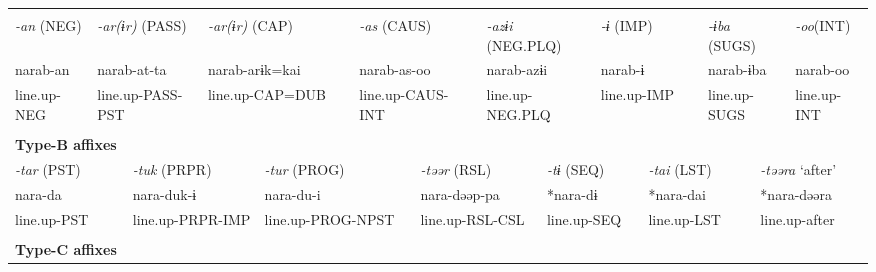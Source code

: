 \tabletail{}
\tablelasttail{}
\begin{tabularx}{\textwidth}{XXXXXXXXXm{}XXXXXXXXXXXX}
\lsptoprule
\multicolumn{22}{X}{{\bfseries Type-A affixes}}\\
{ \textit{{}-an} (NEG)} & \multicolumn{5}{X}{{ \textit{{}-ar(ɨr)} (PASS)}} & \multicolumn{3}{X}{{ \textit{{}-ar(ɨr)} (CAP)}} & \multicolumn{4}{X}{{ \textit{{}-as} (CAUS)}} & \multicolumn{4}{X}{{ \textit{{}-azɨi} (NEG.PLQ)}} & \multicolumn{2}{X}{{ \textit{{}-ɨ} (IMP)}} & \multicolumn{2}{X}{{ \textit{{}-ɨba} (SUGS)}} & { \textit{{}-oo}(INT)}\\
{ narab-an} & \multicolumn{5}{X}{{ narab-at-ta}} & \multicolumn{3}{X}{{ narab-arɨk=kai}} & \multicolumn{4}{X}{{ narab-as-oo}} & \multicolumn{4}{X}{{ narab-azɨi}} & \multicolumn{2}{X}{{ narab-ɨ}} & \multicolumn{2}{X}{{ narab-ɨba}} & { narab-oo}\\
line.up-NEG & \multicolumn{5}{X}{line.up-PASS-PST} & \multicolumn{3}{X}{line.up-CAP=DUB} & \multicolumn{4}{X}{line.up-CAUS-INT} & \multicolumn{4}{X}{line.up-NEG.PLQ} & \multicolumn{2}{X}{line.up-IMP} & \multicolumn{2}{X}{line.up-SUGS} & line.up-INT\\
\multicolumn{22}{X}{}\\
\multicolumn{22}{X}{{\bfseries Type-B affixes}}\\
\multicolumn{3}{X}{{ \textit{{}-tar} (PST)}} & \multicolumn{4}{X}{{ \textit{{}-tuk} (PRPR)}} & \multicolumn{4}{X}{{ \textit{{}-tur} (PROG)}} & \multicolumn{4}{X}{{ \textit{{}-təər} (RSL)}} & \multicolumn{3}{X}{{ \textit{{}-tɨ} (SEQ)}} & \multicolumn{2}{X}{{ \textit{{}-tai} (LST)}} & \multicolumn{2}{X}{{ \textit{{}-təəra} ‘after’}}\\
\multicolumn{3}{X}{{ nara-da}} & \multicolumn{4}{X}{{ nara-duk-ɨ}} & \multicolumn{4}{X}{{ nara-du-i}} & \multicolumn{4}{X}{{ nara-dəəp-pa}} & \multicolumn{3}{X}{{ *nara-dɨ}} & \multicolumn{2}{X}{{ *nara-dai}} & \multicolumn{2}{X}{{ *nara-dəəra}}\\
\multicolumn{3}{X}{line.up-PST} & \multicolumn{4}{X}{line.up-PRPR-IMP} & \multicolumn{4}{X}{line.up-PROG-NPST} & \multicolumn{4}{X}{line.up-RSL-CSL} & \multicolumn{3}{X}{line.up-SEQ} & \multicolumn{2}{X}{line.up-LST} & \multicolumn{2}{X}{{ line.up-after}}\\
\multicolumn{3}{X}{} & \multicolumn{4}{X}{} & \multicolumn{4}{X}{} & \multicolumn{4}{X}{} & \multicolumn{3}{X}{} & \multicolumn{2}{X}{} & \multicolumn{2}{X}{}\\
\multicolumn{22}{X}{{\bfseries Type-C affixes}}\\

\end{tabularx}
